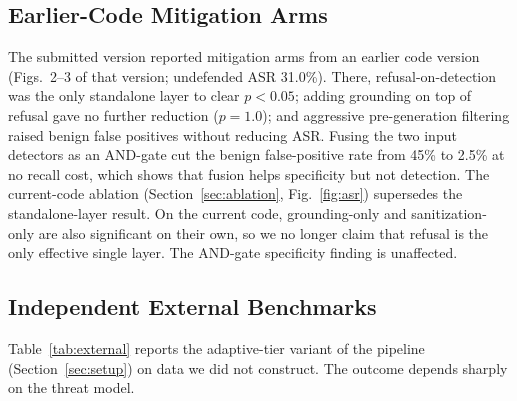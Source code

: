 \documentclass[conference]{IEEEtran}
\begin{document}
\subsection{Earlier-Code Mitigation Arms}\label{sec:stats}
The submitted version reported mitigation arms from an earlier code version (Figs.~2--3 of that version; undefended ASR 31.0\%). There, refusal-on-detection was the only standalone layer to clear $p<0.05$; adding grounding on top of refusal gave no further reduction ($p=1.0$); and aggressive pre-generation filtering raised benign false positives without reducing ASR. Fusing the two input detectors as an AND-gate cut the benign false-positive rate from 45\% to 2.5\% at no recall cost, which shows that fusion helps specificity but not detection. The current-code ablation (Section~\ref{sec:ablation}, Fig.~\ref{fig:asr}) supersedes the standalone-layer result. On the current code, grounding-only and sanitization-only are also significant on their own, so we no longer claim that refusal is the only effective single layer. The AND-gate specificity finding is unaffected.

\subsection{Independent External Benchmarks}\label{sec:external}
Table~\ref{tab:external} reports the adaptive-tier variant of the pipeline (Section~\ref{sec:setup}) on data we did not construct. The outcome depends sharply on the threat model.
\end{document}
